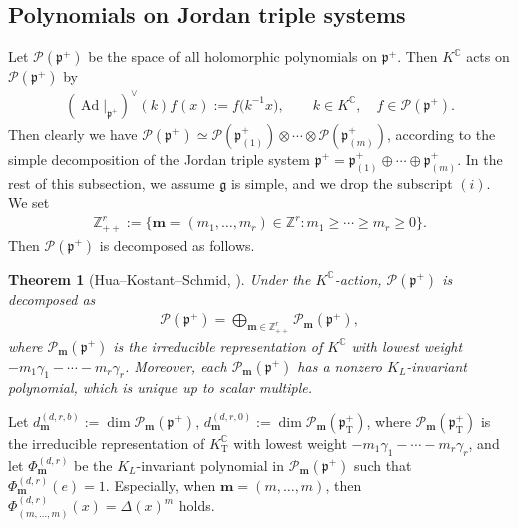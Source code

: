 \documentclass[11pt]{article}
\numberwithin{equation}{section}
\newtheorem{Theorem}{Theorem}[section]
\newcommand{\bm}{\mathbf{m}}
\newcommand{\BZ}{\mathbb{Z}}
\newcommand{\BC}{\mathbb{C}}
\newcommand{\fg}{\mathfrak{g}}
\newcommand{\fp}{\mathfrak{p}}
\newcommand{\cP}{\mathcal{P}}
\newcommand{\rT}{\mathrm{T}}
\begin{document}
\subsection{Polynomials on Jordan triple systems}
Let $\cP(\fp^+)$ be the space of all holomorphic polynomials on $\fp^+$. Then $K^\BC$ acts on $\cP(\fp^+)$ by
\begin{gather*} (\operatorname{Ad}|_{\fp^+})^\vee(k)f(x):=f\big(k^{-1}x\big), \qquad k\in K^\BC,\quad f\in\cP(\fp^+). \end{gather*}
Then clearly we have $\cP(\fp^+)\simeq \cP(\fp^+_{(1)})\otimes\cdots\otimes\cP(\fp^+_{(m)})$, according to the
simple decomposition of the Jordan triple system $\fp^+=\fp^+_{(1)}\oplus\cdots\oplus\fp^+_{(m)}$.
In the rest of this subsection, we assume $\fg$ is simple, and we drop the subscript $(i)$. We set
\begin{gather*} \BZ_{++}^r:=\big\{\bm=(m_1,\ldots,m_r)\in\BZ^r\colon m_1\ge \cdots \ge m_r\ge 0\big\}. \end{gather*}
Then $\cP(\fp^+)$ is decomposed as follows.
\begin{Theorem}[Hua--Kostant--Schmid, {\cite[Part~III, Theorem~V.2.1]{FKKLR}}]\label{HKS}
Under the $K^\BC$-action, $\cP(\fp^+)$ is decomposed as
\begin{gather*} \cP(\fp^+)=\bigoplus_{\bm\in\BZ^{r}_{++}}\cP_\bm(\fp^+), \end{gather*}
where $\cP_\bm(\fp^+)$ is the irreducible representation of $K^\BC$ with lowest weight
$-m_1\gamma_1-\cdots-m_r\gamma_r$. Moreover, each $\cP_\bm(\fp^+)$ has a nonzero $K_L$-invariant polynomial,
which is unique up to scalar multiple.
\end{Theorem}
Let $d_\bm^{(d,r,b)}:=\dim\cP_\bm(\fp^+)$, $d_\bm^{(d,r,0)}:=\dim\cP_\bm(\fp^+_\rT)$,
where $\cP_\bm(\fp^+_\rT)$ is the irreducible representation of $K^\BC_\rT$ with lowest weight $-m_1\gamma_1-\cdots-m_r\gamma_r$,
and let $\Phi_\bm^{(d,r)}$ be the $K_L$-invariant polynomial in $\cP_\bm(\fp^+)$
such that $\Phi_\bm^{(d,r)}(e)=1$. Especially, when $\bm=(m,\ldots,m)$, then $\Phi_{(m,\ldots,m)}^{(d,r)}(x)=\Delta(x)^m$ holds.
\end{document}
